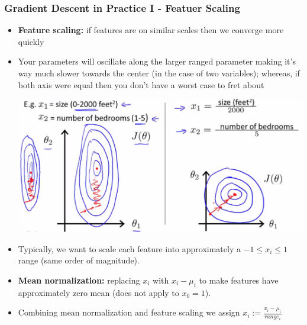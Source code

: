 \subsubsection{Gradient Descent in Practice I - Featuer Scaling}
\begin{itemize}[--]
	\item \textbf{Feature scaling:} if features are on similar scales then we converge more quickly
	\item Your parameters will oscillate along the larger ranged parameter making it's way much slower towards the center (in the case of two variables); whereas, if both axis were equal then you don't have a worst case to fret about
	\begin{center}
		\includegraphics[scale=0.25]{sections/cs229/w2/feature_scaling.png}
	\end{center}

	\item Typically, we want to scale each feature into approximately a $-1\leq x_i \leq 1$ range (same order of magnitude).
	\item \textbf{Mean normalization:} replacing $x_i$ with $x_i-\mu_i$ to make features have approximately zero mean (does not apply to $x_0=1$).
	\item Combining mean normalization and feature scaling we assign $x_i := \frac{x_i-\mu_i}{range_i}$

\end{itemize}

